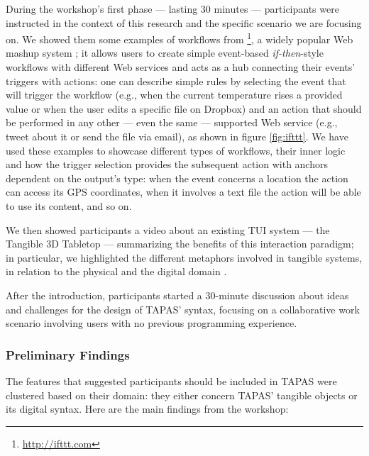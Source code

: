 During the workshop's first phase --- lasting 30 minutes --- participants were instructed in the context of this research and the specific scenario we are focusing on. We showed them some examples of workflows from \footnote{\url{http://ifttt.com}}, a widely popular Web mashup system \cite{Malizia:2011tw}; it allows users to create simple event-based \emph{if-then}-style workflows with different Web services and acts as a hub connecting their events' triggers with actions: one can describe simple rules by selecting the event that will trigger the workflow (e.g., when the current temperature rises a provided value or when the user edits a specific file on Dropbox) and an action that should be performed in any other --- even the same --- supported Web service (e.g., tweet about it or send the file via email), as shown in figure \ref{fig:ifttt}. We have used these examples to showcase different types of workflows, their inner logic and how the trigger selection provides the subsequent action with anchors dependent on the output's type: when the event concerns a location the action can access its GPS coordinates, when it involves a text file the action will be able to use its content, and so on.

We then showed participants a video about an existing \ac{TUI} system --- the Tangible 3D Tabletop \cite{Dalsgaard:2014ut} --- summarizing the benefits of this interaction paradigm; in particular, we highlighted the different metaphors involved in tangible systems, in relation to the physical and the digital domain \cite{Maquil:2011ul}.

After the introduction, participants started a 30-minute discussion about ideas and challenges for the design of \ac{TAPAS}' syntax, focusing on a collaborative work scenario involving users with no previous programming experience.

\subsubsection{Preliminary Findings}
The features that suggested participants should be included in \ac{TAPAS} were clustered based on their domain: they either concern \ac{TAPAS}' tangible objects or its digital syntax. Here are the main findings from the workshop:

